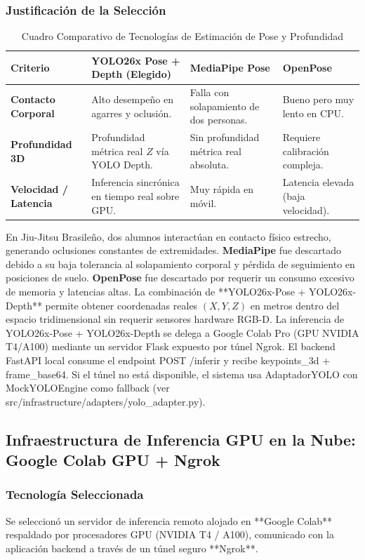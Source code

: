 \subsubsection{Justificación de la Selección}
\begin{table}[htbp]
\centering
\small
\begin{tabularx}{\textwidth}{|>{\bfseries}l|X|X|X|}
    \hline
    Criterio & YOLO26x Pose + Depth (Elegido) & MediaPipe Pose & OpenPose \\ \hline
    Contacto Corporal & Alto desempeño en agarres y oclusión. & Falla con solapamiento de dos personas. & Bueno pero muy lento en CPU. \\ \hline
    Profundidad 3D & Profundidad métrica real $Z$ vía YOLO Depth. & Sin profundidad métrica real absoluta. & Requiere calibración compleja. \\ \hline
    Velocidad / Latencia & Inferencia sincrónica en tiempo real sobre GPU. & Muy rápida en móvil. & Latencia elevada (baja velocidad). \\ \hline
\end{tabularx}
\caption{Cuadro Comparativo de Tecnologías de Estimación de Pose y Profundidad}
\label{tab:comp_pose}
\end{table}

En Jiu-Jitsu Brasileño, dos alumnos interactúan en contacto físico estrecho, generando oclusiones constantes de extremidades. \textbf{MediaPipe} fue descartado debido a su baja tolerancia al solapamiento corporal y pérdida de seguimiento en posiciones de suelo. \textbf{OpenPose} fue descartado por requerir un consumo excesivo de memoria y latencias altas. La combinación de **YOLO26x-Pose + YOLO26x-Depth** permite obtener coordenadas reales $(X, Y, Z)$ en metros dentro del espacio tridimensional sin requerir sensores hardware RGB-D. La inferencia de YOLO26x-Pose + YOLO26x-Depth se delega a Google Colab Pro (GPU NVIDIA T4/A100) mediante un servidor Flask expuesto por túnel Ngrok. El backend FastAPI local consume el endpoint POST /inferir y recibe keypoints\_3d + frame\_base64. Si el túnel no está disponible, el sistema usa AdaptadorYOLO con MockYOLOEngine como fallback (ver src/infrastructure/adapters/yolo\_adapter.py).

\subsection{Infraestructura de Inferencia GPU en la Nube: Google Colab GPU + Ngrok}

\subsubsection{Tecnología Seleccionada}
Se seleccionó un servidor de inferencia remoto alojado en **Google Colab** respaldado por procesadores GPU (NVIDIA T4 / A100), comunicado con la aplicación backend a través de un túnel seguro **Ngrok**.


